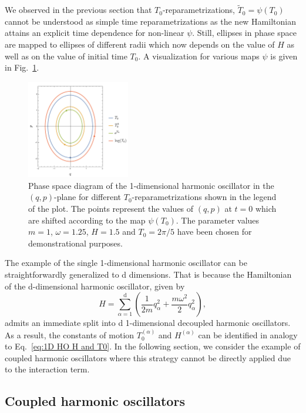 \documentclass[twocolumn,notitlepage,superscriptaddress, nofootinbib,nobibnotes, aps,prd,10pt]{revtex4-1}%
\begin{document}
We observed in the previous section that $T_0$-reparametrizations, $\tilde{T}_0 = \psi(T_0)$ cannot be understood as simple time reparametrizations as the new Hamiltonian attains an explicit time dependence for non-linear $\psi$. Still, ellipses in phase space are mapped to ellipses of different radii which now depends on the value of $H$ as well as on the value of initial time $T_0$. A visualization for various maps $\psi$ is given in Fig.~\ref{fig:T0 reparam}.

\begin{figure}
    \centering
    \includegraphics[width=0.4\textwidth]{figures/T0reparam.pdf}
    \caption{Phase space diagram of the 1-dimensional harmonic oscillator in the $(q,p)$-plane for different $T_0$-reparametrizations shown in the legend of the plot. The points represent the values of $(q,p)$ at $t = 0$ which are shifted according to the map $\psi(T_0)$. The parameter values $m=1$, $\omega = 1.25$, $H = 1.5$ and $T_0 = 2\pi/5$ have been chosen for demonstrational purposes.}
    \label{fig:T0 reparam}
\end{figure}

The example of the single 1-dimensional harmonic oscillator can be straightforwardly generalized to d dimensions. That is because the Hamiltonian of the d-dimensional harmonic oscillator, given by 
%
\begin{equation}
H = \sum_{\alpha = 1}^\mathrm{d}\left(\frac{1}{2m}q_\alpha^2+\frac{m\omega^2}{2}q_\alpha^2\right),
\end{equation}
%
admits an immediate split into d 1-dimensional decoupled harmonic oscillators. As a result, the constants of motion $T_0^{(\alpha)}$ and $H^{(\alpha)}$ can be identified in analogy to Eq.~\eqref{eq:1D HO H and T0}. In the following section, we consider the example of coupled harmonic oscillators where this strategy cannot be directly applied due to the interaction term.

\subsection{Coupled harmonic oscillators}\label{sec:coupled HOs}
\end{document}
